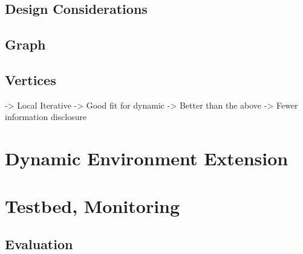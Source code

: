 \subsection{Design Considerations}
\subsection{Graph}
\subsection{Vertices}

-> Local Iterative
-> Good fit for dynamic
-> Better than the above
-> Fewer information disclosure

\section{Dynamic Environment Extension}

%
%
%
%

\section{Testbed, Monitoring}
\subsection{Evaluation}
